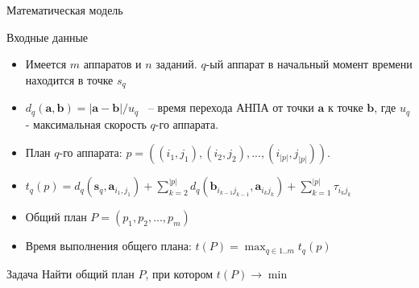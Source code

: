 \documentclass{beamer}
\begin{document}
\begin{frame}{Математическая модель}


\begin{block}{Входные данные}
\begin{itemize}
\item Имеется $m$ аппаратов и $n$ заданий. $q$-ый аппарат в начальный момент времени находится в точке $s_q$
\item $d_q(\mathbf{a}, \mathbf{b}) = |\mathbf{a} - \mathbf{b}| / u_q$ ~-- время перехода АНПА от точки $\mathbf{a}$ к точке $\mathbf{b}$, где $u_q$ - максимальная скорость $q$-го аппарата.
\end{itemize}
\end{block}

\begin{itemize}

\item План $q$-го аппарата: $p = ((i_1, j_1), (i_2, j_2), ..., (i_{|p|}, j_{|p|}))$.

\item
$
t_q(p) = d_q(\mathbf{s}_q, \mathbf{a}_{i_1, j_1}) + \displaystyle\sum_{k=2}^{|p|} d_q(\mathbf{b}_{i_{k-1} j_{k - 1}}, \mathbf{a}_{i_k j_k}) + \displaystyle\sum_{k=1}^{|p|}\tau_{i_k j_k}
$

\item Общий план $P = (p_1, p_2, ..., p_m)$
\item Время выполнения общего плана: $t(P) = \displaystyle \max_{q \in 1..m} t_q(p)$

\end{itemize}

\begin{block}{Задача}
Найти общий план $P$, при котором $t(P) \rightarrow \min$
\end{block}

\end{frame}
\end{document}
